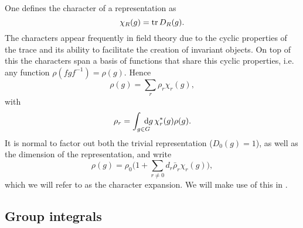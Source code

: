 One defines the character of a representation as
%
\begin{equation}
  \chi_R(g) = \operatorname{tr} D_R(g).
\end{equation}
%
The characters appear frequently in field theory due to the cyclic properties of
the trace and its ability to facilitate the creation of invariant objects. On
top of this the characters span a basis of functions that share this cyclic
properties, i.e. any function $\rho(f g f^{-1}) = \rho(g)$. Hence
%
\begin{equation}
  \rho(g) = \sum_r \rho_r \chi_r(g),
\end{equation}
%
with
\begin{equation}
  \rho_r = \int_{\mathrlap{g \in G}\hskip1.5ex} \mathrm{d}g \, \chi_r^*(g) \rho(g).
\end{equation}
%
It is normal to factor out both the trivial representation ($D_0(g) = 1$), as
well as the dimension of the representation, and write
%
\begin{equation}
  \rho(g) = \rho_0 \Big(1 + \sum_{r \neq 0} d_r \bar{\rho}_r \chi_r(g)\Big),
\end{equation}
%
which we will refer to as the character expansion. We will make use of this in
.

\subsection{Group integrals}

